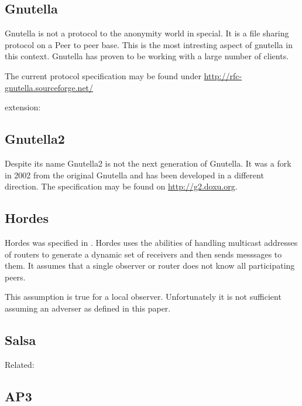 \subsection{Gnutella}
Gnutella is not a protocol to the anonymity world in special. It is a file sharing protocol on a Peer to peer base. This is the most intresting aspect of gnutella in this context. Gnutella has proven to be working with a large number of clients.

The current protocol specification may be found under \href{http://rfc-gnutella.sourceforge.net/developer/stable/index.html}{http://rfc-gnutella.sourceforge.net/}

extension: \cite{AthanRAM07}


\subsection{Gnutella2}
Despite its name Gnutella2 is not the next generation of Gnutella. It was a fork in 2002 from the original Gnutella and has been developed in a different direction. The specification may be found on \href{http://g2.doxu.org}{http://g2.doxu.org}.


\subsection{Hordes}
Hordes was specified in \cite{Levine:2002}. Hordes uses the abilities of handling multicast addresses of routers to generate a dynamic set of receivers and then sends messsages to them. It assumes that a single observer or router does not know all participating peers. 

This assumption is true for a local observer. Unfortunately it is not sufficient assuming an adverser as defined in this paper.

\subsection{Salsa}
\cite{Salsa}

Related: \cite{ccs2008:mittal}


\subsection{AP3}

